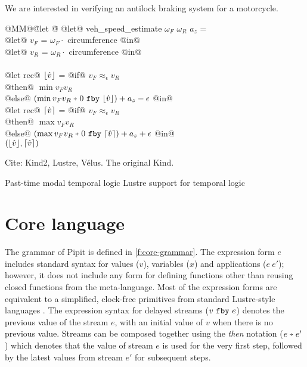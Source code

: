 \documentclass[sigplan,screen]{acmart}
\begin{document}
We are interested in verifying an antilock braking system for a motorcycle\cite{huang2010design}.

\begin{tabbing}
  @MM@\= @let @\= \kill
  @let@ veh\_speed\_estimate $\omega_F$ $\omega_R$ $a_z$ = \\
    \> @let@ $v_F$ = $\omega_F \cdot $ circumference @in@ \\
    \> @let@ $v_R$ = $\omega_R \cdot $ circumference @in@ \\
    \\
    \> @let rec@ $\lfloor \hat{v} \rfloor$ = @if@ $v_F \approx_\epsilon v_R$ \\
    \> \> @then@ $\min v_F v_R$ \\
    \> \> @else@ $(\xthen{\min v_F v_R}{\xfby{0}{\floor{\hat{v}}}}) + a_z - \epsilon$ @in@ \\
    \> @let rec@ $\lceil \hat{v} \rceil$ = @if@ $v_F \approx_\epsilon v_R$ \\
    \> \> @then@ $\max v_F v_R$ \\
    \> \> @else@ $(\xthen{\max v_F v_R}{\xfby{0}{\ceil{\hat{v}}}}) + a_z + \epsilon$ @in@
    \\
    \> $(\lfloor \hat{v} \rfloor, \lceil \hat{v} \rceil)$
\end{tabbing}


Cite: Kind2\cite{champion2016kind2}, Lustre\cite{caspi1995functional}, Vélus\cite{bourke2017formally}.
The original Kind\cite{hagen2008scaling}.

Past-time modal temporal logic \cite{lichtenstein1985glory}
Lustre support for temporal logic \cite{halbwachs1993executable}

\section{Core language}
\label{s:core}





The grammar of Pipit is defined in \autoref{f:core-grammar}.
The expression form $e$ includes standard syntax for values ($v$), variables ($x$) and applications ($e~e'$); however, it does not include any form for defining functions other than reusing closed functions from the \fstar{} meta-language.
Most of the expression forms are equivalent to a simplified, clock-free primitives from standard Lustre-style languages \cite{caspi1995functional}.
The expression syntax for delayed streams ($v~\texttt{fby}~e$) denotes the previous value of the stream $e$, with an initial value of $v$ when there is no previous value.
Streams can be composed together using the \emph{then} notation ($\xthen{e}{e'}$) which denotes that the value of stream $e$ is used for the very first step, followed by the latest values from stream $e'$ for subsequent steps.
\end{document}

